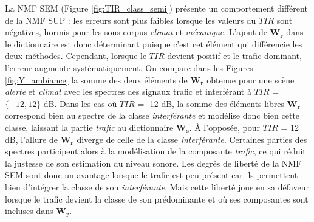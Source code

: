 La NMF SEM (Figure \ref{fig:TIR_class_semi}) présente un comportement différent de la NMF SUP : les erreurs sont plus faibles lorsque les valeurs du $TIR$ sont négatives, hormis pour les sous-corpus \textit{climat}  et \textit{mécanique}. L'ajout de $\mathbf{W_r}$ dans le dictionnaire est donc déterminant puisque c'est cet élément qui différencie les deux méthodes. Cependant, lorsque le $TIR$ devient positif et le trafic dominant, l'erreur augmente systématiquement.
On compare dans les Figures \ref{fig:Y_ambiance} la somme des deux éléments de $\mathbf{W_r}$ obtenue pour une scène \textit{alerte} et \textit{climat} avec les spectres des signaux trafic et interférant à $TIR$ = $\lbrace -12, 12 \rbrace$ dB. Dans les cas où $TIR$ = -12 dB, la somme des éléments libres $\mathbf{W_r}$ correspond bien au spectre de la classe \textit{interférante} et modélise donc bien cette classe, laissant la partie \textit{trafic} au dictionnaire $\mathbf{W_s}$. À l'opposée, pour $TIR$ = 12 dB, l'allure de $\mathbf{W_r}$ diverge de celle de la classe \textit{interférante}. Certaines parties des spectres participent alors à la modélisation de la composante \textit{trafic}, ce qui réduit la justesse de son estimation du niveau sonore. Les degrés de liberté de la NMF SEM sont donc un avantage lorsque le trafic est peu présent car ils permettent bien d'intégrer la classe de son \textit{interférante}. Mais cette liberté joue en sa défaveur lorsque le trafic devient la classe de son prédominante et où ses composantes sont incluses dans $\mathbf{W_r}$.\\


